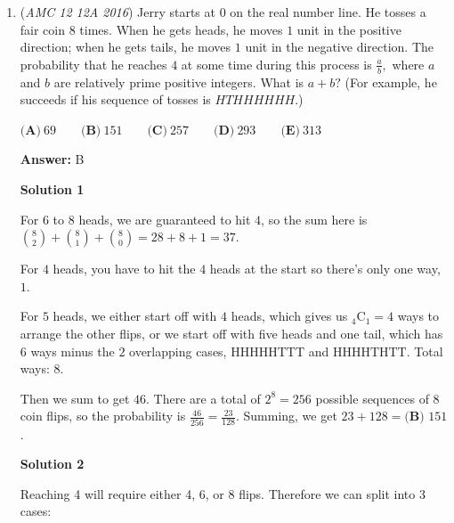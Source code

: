 \begin{enumerate}
 It follows that $n^3$ contributes exponents $3$ and $9$ to two of these primes, so $n^3 = p_1^3\cdot p_2^9$ for distinct primes $p_1, p_2 \in \{2,5,11\}.$ Hence, $n = p_1\cdot p_2^3.$ There are six possible values of $n$ of this form.

 Now consider $81n^4.$ Since $81 = 3^4$ and $n^4 = p_1^4\cdot p_2^{12},$ we obtain $81n^4 = 3^4\cdot p_1^4\cdot p_2^{12}.$ Applying the divisor formula yields $(4+1)(4+1)(12+1)=5\cdot5\cdot13=\boxed{\textbf{(D) }325}.$

 - AMBRIGGS

 


	\item (\textit{AMC 12 12A 2016}) Jerry starts at $0$ on the real number line. He tosses a fair coin $8$ times. When he gets heads, he moves $1$ unit in the positive direction; when he gets tails, he moves $1$ unit in the negative direction. The probability that he reaches $4$ at some time during this process is $\frac{a}{b},$ where $a$ and $b$ are relatively prime positive integers. What is $a + b?$ (For example, he succeeds if his sequence of tosses is $HTHHHHHH.$)


 $\textbf{(A)}\ 69\qquad\textbf{(B)}\ 151\qquad\textbf{(C)}\ 257\qquad\textbf{(D)}\ 293\qquad\textbf{(E)}\ 313$

 \textbf{Answer: }B



\textbf{Solution 1}

For $6$ to $8$ heads, we are guaranteed to hit $4$, so the sum here is $\binom{8}{2}+\binom{8}{1}+\binom{8}{0}=28+8+1=37$.

 For $4$ heads, you have to hit the $4$ heads at the start so there's only one way, $1$.

 For $5$ heads, we either start off with $4$ heads, which gives us $_4\text{C}_1=4$ ways to arrange the other flips, or we start off with five heads and one tail, which has $6$ ways minus the $2$ overlapping cases, $\text{HHHHHTTT}$ and $\text{HHHHTHTT}$. Total ways: $8$.

 Then we sum to get $46$. There are a total of $2^8=256$ possible sequences of $8$ coin flips, so the probability is $\frac{46}{256}=\frac{23}{128}$. Summing, we get $23+128=\boxed{\textbf{(B) }151}$.

 



\textbf{Solution 2}

Reaching 4 will require either 4, 6, or 8 flips. Therefore we can split into 3 cases: 


\end{enumerate}
